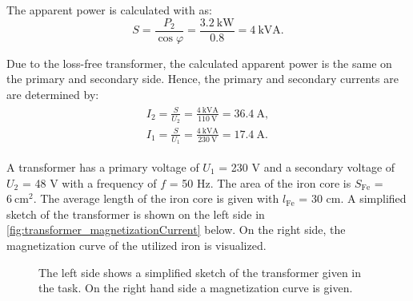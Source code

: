 
\begin{solutionblock}
  
  The apparent power is calculated with as:
  \begin{equation}
    S = \frac{P_{\mathrm{2}}}{\cos \varphi}
    = \frac{\SI{3.2}{\kilo \watt}}{0.8}
    = \SI{4}{\kilo\volt\ampere}.
  \end{equation}

  Due to the loss-free transformer, the calculated apparent power is the same on the primary and secondary side. Hence, the primary and secondary currents are are determined by:
  \begin{align}
    \begin{split}
      I_{\mathrm{2}} = \frac{S}{U_{\mathrm{2}}}
      = \frac{\SI{4}{\kilo\volt\ampere}}{\SI{110}{\volt}}
      = \SI{36.4}{\ampere}, \\
      I_{\mathrm{1}} = \frac{S}{U_{\mathrm{1}}}
      = \frac{\SI{4}{\kilo\volt\ampere}}{\SI{230}{\volt}}
      = \SI{17.4}{\ampere}.
    \end{split}
  \end{align}
\end{solutionblock}







A transformer has a primary voltage of $U_{\mathrm{1}}$ = 230 V and a secondary voltage of $U_{\mathrm{2}}$ = 48 V with a frequency of $f$ = 50 Hz. The area of the iron core is $S_{\mathrm{Fe}}$ = $\SI{6}{\centi \metre \squared}$. The average length of the iron core is given with $l_{\mathrm{Fe}}$ = 30 cm. A simplified sketch of the transformer is shown on the left side in \autoref{fig:transformer_magnetizationCurrent} below. On the right side, the magnetization curve of the utilized iron is visualized.

\begin{figure}[htb]
  \centering
  
  \caption{The left side shows a simplified sketch of the transformer given in the task. On the right hand side a magnetization curve is given.}
  \label{fig:transformer_magnetizationCurrent}
\end{figure}



